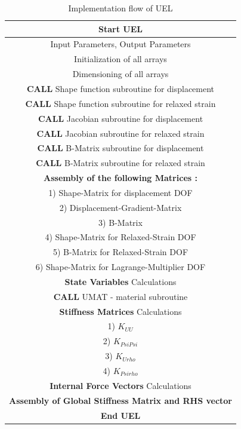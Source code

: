 \documentclass[12pt]{article}
\begin{document}
\begin{table}[H]
	\begin{center}
		\begin{tabular}{||c ||} 
			\hline
			\textbf{Start UEL} \\ [0.8ex] 
			\hline\hline
			Input Parameters, Output Parameters  \\ 
			[0.8ex]
			\hline
			Initialization of all arrays  \\ 
			[0.8ex]
			\hline
		    Dimensioning of all arrays  \\ 
			[0.8ex]
			\hline
			\textbf{CALL} Shape function subroutine for displacement \\ 
			[0.8ex]
			\hline
			\textbf{CALL} Shape function subroutine for relaxed strain   \\ 
			[0.8ex]
			\hline
			\textbf{CALL} Jacobian subroutine for displacement \\ 
			[0.8ex]
			\hline
			\textbf{CALL} Jacobian subroutine for relaxed strain  \\ 
			[0.8ex]
			\hline
			\textbf{CALL} B-Matrix subroutine for displacement  \\ 
			\hline
			\textbf{CALL} B-Matrix subroutine for relaxed strain  \\ 
			[0.8ex]
			\hline		
			\textbf{Assembly of the following Matrices :} \\
			1) Shape-Matrix for displacement DOF \\
			2) Displacement-Gradient-Matrix \\
			3) B-Matrix \\
			4) Shape-Matrix for Relaxed-Strain DOF \\
			5) B-Matrix for Relaxed-Strain DOF \\
			6) Shape-Matrix for Lagrange-Multiplier DOF \\
			[0.8ex] 
			\hline
			\textbf{State Variables} Calculations   \\  [0.8ex] 
			\hline
			\textbf{CALL} UMAT - material subroutine   \\  [0.8ex] 
			\hline
			\textbf{Stiffness Matrices} Calculations  \\  
			1) $K_{UU}$ \\
			2) $K_{PsiPsi}$ \\
			3) $K_{Urho}$ \\
			4) $K_{Psirho}$ \\   [0.8ex] 
			\hline
			\textbf{Internal Force Vectors} Calculations  \\  [0.8ex] 
			\hline
			\textbf{Assembly of Global Stiffness Matrix and RHS vector}   \\  [0.8ex] 
			\hline
			\hline
		    \textbf{End UEL}   \\  [0.8ex] 
		    \hline
		\end{tabular}
		\caption{Implementation flow of UEL}
	\end{center}
\end{table}
\end{document}
